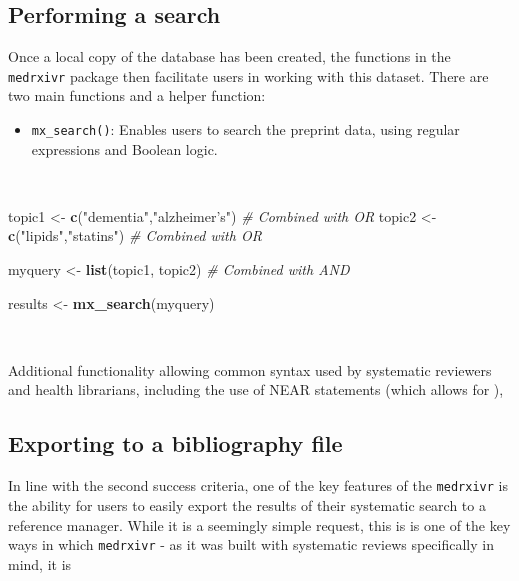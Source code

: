 \documentclass[a4paper, twoside]{templates/ociamthesis}
\providecommand{\tightlist}{%
  \setlength{\itemsep}{0pt}\setlength{\parskip}{0pt}}
\newenvironment{Shaded}{\begin{snugshade}}{\end{snugshade}}
\newcommand{\CommentTok}[1]{\textcolor[rgb]{0.56,0.35,0.01}{\textit{#1}}}
\newcommand{\KeywordTok}[1]{\textcolor[rgb]{0.13,0.29,0.53}{\textbf{#1}}}
\newcommand{\NormalTok}[1]{#1}
\newcommand{\StringTok}[1]{\textcolor[rgb]{0.31,0.60,0.02}{#1}}
\renewenvironment{Shaded}
{
  \vspace{4pt}%
  \begin{snugshade}%
}{%
  \end{snugshade}%
  \vspace{4pt}%
}
\begin{document}
\hypertarget{performing-a-search}{%
\subsection{Performing a search}\label{performing-a-search}}

Once a local copy of the database has been created, the functions in the \texttt{medrxivr} package then facilitate users in working with this dataset. There are two main functions and a helper function:

\begin{itemize}
\tightlist
\item
  \texttt{mx\_search()}: Enables users to search the preprint data, using regular expressions and Boolean logic.
\end{itemize}

~

\begin{Shaded}
\begin{Highlighting}[]
\NormalTok{topic1  <-}\StringTok{ }\KeywordTok{c}\NormalTok{(}\StringTok{"dementia"}\NormalTok{,}\StringTok{"alzheimer's"}\NormalTok{)  }\CommentTok{# Combined with OR}
\NormalTok{topic2  <-}\StringTok{ }\KeywordTok{c}\NormalTok{(}\StringTok{"lipids"}\NormalTok{,}\StringTok{"statins"}\NormalTok{)        }\CommentTok{# Combined with OR}

\NormalTok{myquery <-}\StringTok{ }\KeywordTok{list}\NormalTok{(topic1, topic2)         }\CommentTok{# Combined with AND}

\NormalTok{results <-}\StringTok{ }\KeywordTok{mx_search}\NormalTok{(myquery)}
\end{Highlighting}
\end{Shaded}

~

Additional functionality allowing common syntax used by systematic reviewers and health librarians, including the use of NEAR statements (which allows for ),

\hypertarget{exporting-to-a-bibliography-file}{%
\subsection{Exporting to a bibliography file}\label{exporting-to-a-bibliography-file}}

In line with the second success criteria, one of the key features of the \texttt{medrxivr} is the ability for users to easily export the results of their systematic search to a reference manager. While it is a seemingly simple request, this is is one of the key ways in which \texttt{medrxivr} - as it was built with systematic reviews specifically in mind, it is
\end{document}
